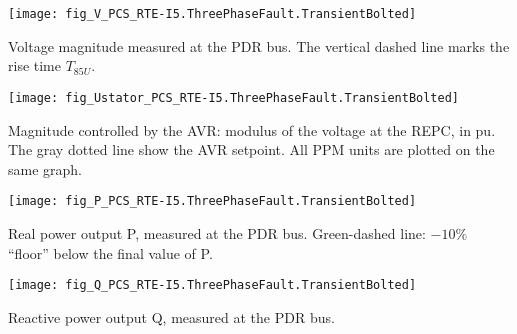     \noindent
    \begin{minipage}[t]{0.48\textwidth}
        \centering
        \texttt{[image: fig\_V\_PCS\_RTE-I5.ThreePhaseFault.TransientBolted]}
        \begin{minipage}[t]{0.8\textwidth}
            \small Voltage magnitude measured at the PDR bus.
            The vertical dashed line marks the rise time $T_{85U}$.
        \end{minipage}
    \end{minipage}
    \hfill
    \begin{minipage}[t]{0.48\textwidth}
        \centering
        \texttt{[image: fig\_Ustator\_PCS\_RTE-I5.ThreePhaseFault.TransientBolted]}
        \begin{minipage}[t]{0.8\textwidth}
            \small Magnitude controlled by the AVR: modulus of the voltage at the REPC, in pu.
            The gray dotted line show the AVR setpoint. All PPM units are plotted on the same
            graph.
        \end{minipage}
    \end{minipage}

    \vspace{0.5cm}

    \noindent
    \begin{minipage}[t]{0.48\textwidth}
        \centering
        \texttt{[image: fig\_P\_PCS\_RTE-I5.ThreePhaseFault.TransientBolted]}
        \begin{minipage}[t]{0.8\textwidth}
            \small Real power output P, measured at the PDR bus. Green-dashed
            line: $-10\%$ ``floor'' below the final value of P.
        \end{minipage}
    \end{minipage}
    \hfill
    \begin{minipage}[t]{0.48\textwidth}
        \centering
        \texttt{[image: fig\_Q\_PCS\_RTE-I5.ThreePhaseFault.TransientBolted]}
        \begin{minipage}[t]{0.8\textwidth}
            \small Reactive power output Q, measured at the PDR bus.
        \end{minipage}
    \end{minipage}

    \vspace{0.5cm}

